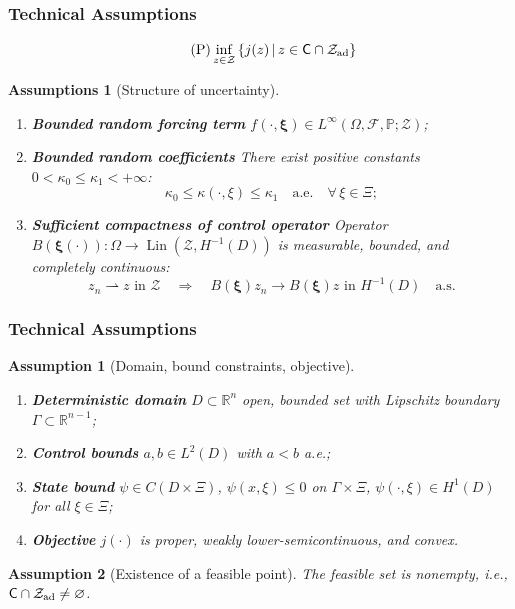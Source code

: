 \documentclass[aspectratio=169,xcolor=dvipsnames,11pt]{beamer}
\newtheorem{assumption}{Assumption}
\newtheorem{assumptions}{Assumptions}
\renewcommand{\Pr}{\mathbb{P}}
\renewcommand{\implies}{\Rightarrow}
\renewcommand{\emptyset}{\varnothing}
\newcommand{\wlim}{\rightharpoonup}
\DeclareMathOperator{\lin}{Lin}
\newcommand{\setC}{\mathsf{C}}
\newcommand{\setZ}{\mathcal{Z}}
\newcommand{\xibold}{\mathbold{\xi}}
\newcommand{\scrF}{\mathcal{F}}
\newcommand{\scrZ}{\mathcal{Z}}
\begin{document}
\begin{footnotesize}
\begin{frame}\frametitle{Technical Assumptions}
\begin{equation}\label{P}\tag{P}
  \inf_{z\in\setZ}\left\{ j(z) \,\vert\,  z\in\setC\cap\setZ_{\rm ad} \right\}
\end{equation}
\begin{assumptions}[Structure of uncertainty]\label{as:pde}
\pause
\begin{enumerate}
\item 
\textbf{Bounded random forcing term} $f(\cdot,\xibold)\in L^{\infty}(\Omega,\scrF,\Pr; \scrZ)$;\pause
\item 
\textbf{Bounded random coefficients} There exist positive constants $0 < \kappa_0 \le \kappa_1 < +\infty$:
\[
  \kappa_{0}\le \kappa(\cdot,\xi)\le\kappa_{1} \quad \text{a.e.}\quad\forall\,\xi\in\Xi;
\]
\item \pause
\textbf{Sufficient compactness of control operator} Operator
$B(\xibold(\cdot)):\Omega\to\lin(\scrZ,H^{-1}(D))$ is measurable, bounded, and completely continuous:
\[
  z_{n} \wlim z\text{ in }\scrZ \quad\implies\quad B(\xibold)z_{n}\to B(\xibold)z \text{ in }H^{-1}(D)\quad\text{a.s.}
\]
\end{enumerate}
\end{assumptions}
\end{frame}

\begin{frame}\frametitle{Technical Assumptions}
\begin{assumption}[Domain, bound constraints, objective]\label{as:object_bounds}
\pause
\begin{enumerate}
\item \textbf{Deterministic domain} $D\subset\mathbb R^n$ open, bounded set with Lipschitz boundary
      $\Gamma\subset \mathbb R^{n-1}$;
\item \textbf{Control bounds} $a,b \in L^{2}(D)$ with $a<b$ a.e.;
\item \textbf{State bound} $\psi \in C({D}\times\Xi)$, $\psi(x,\xi)\leq 0$ on
      $\Gamma\times\Xi$, $\psi(\cdot,\xi) \in H^1(D)$
      for all $\xi\in\Xi$;
\item \textbf{Objective} $j(\cdot)$ is proper, weakly lower-semicontinuous, and convex.
\end{enumerate}
\end{assumption}\pause
\begin{assumption}[Existence of a feasible point]\label{ass:feas}
  The feasible set is nonempty, i.e., $\setC \cap \setZ_{\rm ad} \neq\emptyset$.
\end{assumption}
\pause


\end{frame}
\end{footnotesize}
\end{document}
